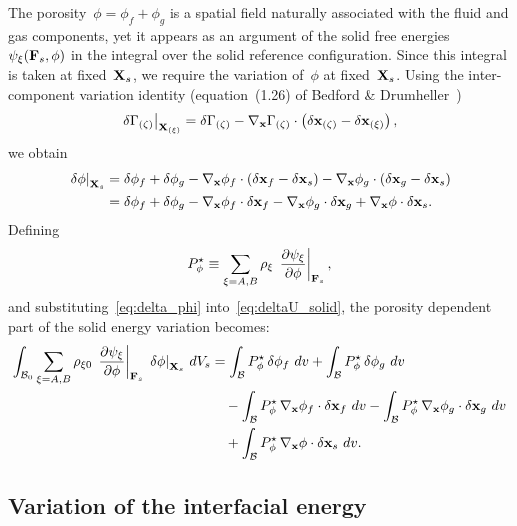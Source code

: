 The porosity~$\phi = \phi_f + \phi_g$ is a spatial field naturally associated with the fluid and gas components, yet it appears as an argument of the solid free energies $\psi_\xi(\mathbf{F}_s, \phi)$ in the integral over the solid reference configuration.  Since this integral is taken at fixed~$\mathbf{X}_s$, we require the variation of~$\phi$ at fixed~$\mathbf{X}_s$.  Using the inter-component variation identity (equation~(1.26) of Bedford \& Drumheller~\cite{bedford1983theories})
\begin{equation}
  \left.\delta\Gamma_{(\zeta)}\right|_{\mathbf{X}_{(\xi)}} = \delta\Gamma_{(\zeta)} - \nabla_{\mathbf{x}}\Gamma_{(\zeta)} \cdot \left(\delta\mathbf{x}_{(\zeta)} - \delta\mathbf{x}_{(\xi)}\right),
  \label{eq:BD_identity}
\end{equation}
we obtain
\begin{align}
  \left.\delta\phi\right|_{\mathbf{X}_s}
  &= \delta\phi_f + \delta\phi_g - \nabla_{\mathbf{x}}\phi_f \cdot \left(\delta\mathbf{x}_f - \delta\mathbf{x}_s\right) - \nabla_{\mathbf{x}}\phi_g \cdot \left(\delta\mathbf{x}_g - \delta\mathbf{x}_s\right) \notag \\
  &= \delta\phi_f + \delta\phi_g - \nabla_{\mathbf{x}}\phi_f \cdot \delta\mathbf{x}_f - \nabla_{\mathbf{x}}\phi_g \cdot \delta\mathbf{x}_g + \nabla_{\mathbf{x}}\phi \cdot \delta\mathbf{x}_s.
  \label{eq:delta_phi}
\end{align}
Defining
\begin{equation}
  P^\star_\phi \equiv \sum_{\xi=A,B} \rho_\xi\,\left.\frac{\partial \psi_\xi}{\partial \phi}\right\vert_{\mathbf{F}_s},
  \label{eq:Pstar_phi}
\end{equation}
and substituting~\eqref{eq:delta_phi} into~\eqref{eq:deltaU_solid}, the porosity dependent part of the solid energy variation becomes:
\begin{align}
  \int_{\mathcal{B}_{0}} \sum_{\xi=A,B} \rho_{\xi 0}\,\left.\frac{\partial \psi_\xi}{\partial \phi}\right\vert_{\mathbf{F}_s}\, \left.\delta\phi\right|_{\mathbf{X}_s}\, dV_s
  &= \int_{\mathcal{B}} P^\star_\phi\, \delta\phi_f \,\,dv + \int_{\mathcal{B}} P^\star_\phi\, \delta\phi_g \,\,dv \notag \\
  &\quad - \int_{\mathcal{B}} P^\star_\phi\, \nabla_{\mathbf{x}}\phi_f \cdot \delta\mathbf{x}_f \,\,dv - \int_{\mathcal{B}} P^\star_\phi\, \nabla_{\mathbf{x}}\phi_g \cdot \delta\mathbf{x}_g \,\,dv \notag \\
  &\quad + \int_{\mathcal{B}} P^\star_\phi\, \nabla_{\mathbf{x}}\phi \cdot \delta\mathbf{x}_s \,\,dv.
  \label{eq:phi_variation_split}
\end{align}

\subsection{Variation of the interfacial energy}

